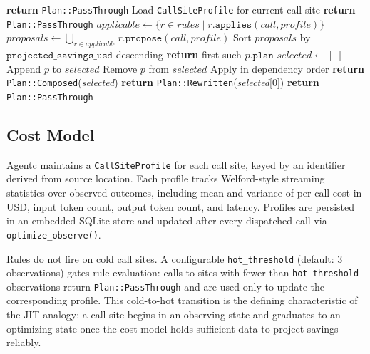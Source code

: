 \begin{algorithm*}
\caption{Agentc planner}
\label{alg:planner}
\begin{algorithmic}[1]
    \STATE \textbf{return} \texttt{Plan::PassThrough}
\ENDIF
\STATE Load \texttt{CallSiteProfile} for current call site
    \STATE \textbf{return} \texttt{Plan::PassThrough} 
\ENDIF
\STATE $\textit{applicable} \leftarrow \{r \in \textit{rules} \mid r.\texttt{applies}(\textit{call}, \textit{profile})\}$
\STATE $\textit{proposals} \leftarrow \bigcup_{r \in \textit{applicable}} r.\texttt{propose}(\textit{call}, \textit{profile})$
\STATE Sort $\textit{proposals}$ by $\texttt{projected\_savings\_usd}$ descending
    \STATE \textbf{return} first such $p.\texttt{plan}$ 
\ENDIF
\STATE $\textit{selected} \leftarrow [\;]$
        \STATE Append $p$ to $\textit{selected}$
    \ENDIF
\ENDFOR
{}
        \STATE Remove $p$ from $\textit{selected}$
    \ENDIF
\ENDFOR
{}
    \STATE Apply in dependency order
    \STATE \textbf{return} \texttt{Plan::Composed}(\textit{selected})
    \STATE \textbf{return} \texttt{Plan::Rewritten}(\textit{selected}[0])
\ELSE
    \STATE \textbf{return} \texttt{Plan::PassThrough}
\ENDIF
\end{algorithmic}
\end{algorithm*}

\subsection{Cost Model}

Agentc maintains a \texttt{CallSiteProfile} for each call site, keyed by an
identifier derived from source location. Each profile tracks Welford-style streaming
statistics over observed outcomes, including mean and variance of per-call cost in
USD, input token count, output token count, and latency. Profiles are persisted in an
embedded SQLite store and updated after every dispatched call via
\texttt{optimize\_observe()}.

Rules do not fire on cold call sites. A configurable \texttt{hot\_threshold} (default:
3 observations) gates rule evaluation: calls to sites with fewer than
\texttt{hot\_threshold} observations return \texttt{Plan::PassThrough} and are used
only to update the corresponding profile. This cold-to-hot transition is the defining
characteristic of the JIT analogy: a call site begins in an observing state and
graduates to an optimizing state once the cost model holds sufficient data to project
savings reliably.

